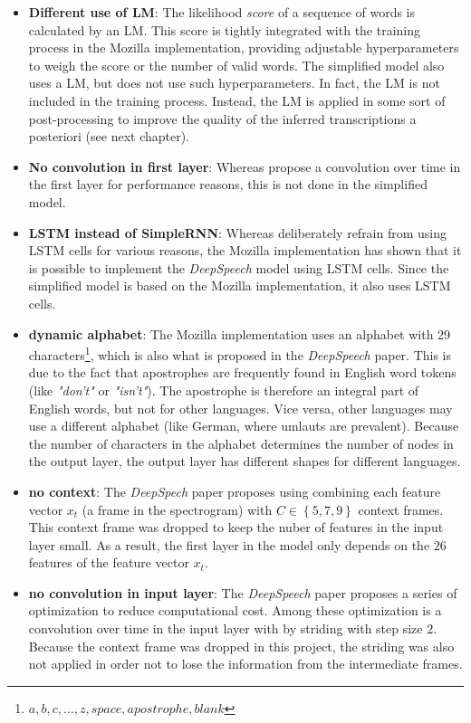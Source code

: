 \begin{itemize}
	\item \textbf{Different use of LM}: The likelihood \textit{score} of a sequence of words is calculated by an \ac{LM}. This score is tightly integrated with the training process in the Mozilla implementation, providing adjustable hyperparameters to weigh the score or the number of valid words. The simplified model also uses a \ac{LM}, but does not use such hyperparameters. In fact, the \ac{LM} is not included in the training process. Instead, the \ac{LM} is applied in some sort of post-processing to improve the quality of the inferred transcriptions a posteriori (see next chapter).
	\item \textbf{No convolution in first layer}: Whereas \cite{ctc_paper} propose a convolution over time in the first layer for performance reasons, this is not done in the simplified model.
	\item \textbf{LSTM instead of SimpleRNN}: Whereas \cite{ctc_paper} deliberately refrain from using \ac{LSTM} cells for various reasons, the Mozilla implementation has shown that it is possible to implement the \textit{DeepSpeech} model using \ac{LSTM} cells. Since the simplified model is based on the Mozilla implementation, it also uses \ac{LSTM} cells.
	\item \textbf{dynamic alphabet}: The Mozilla implementation uses an alphabet with 29 characters\footnote{${a,b,c,...,z, space, apostrophe, blank}$}, which is also what is proposed in the \textit{DeepSpeech} paper. This is due to the fact that apostrophes are frequently found in English word tokens (like \textit{"don't"} or \textit{"isn't"}). The apostrophe is therefore an integral part of English words, but not for other languages. Vice versa, other languages may use a different alphabet (like German, where umlauts are prevalent). Because the number of characters in the alphabet determines the number of nodes in the output layer, the output layer has different shapes for different languages.
	\item \textbf{no context}: The \textit{DeepSpech} paper proposes using combining each feature vector $x_t$ (a frame in the spectrogram) with $C \in \left\{ 5,7,9 \right\}$ context frames. This context frame was dropped to keep the nuber of features in the input layer small. As a result, the first layer in the model only depends on the $26$ features of the feature vector $x_t$.
	\item \textbf{no convolution in input layer}: The \textit{DeepSpeech} paper proposes a series of optimization to reduce computational cost. Among these optimization is a convolution over time in the input layer with by striding with step size $2$. Because the context frame was dropped in this project, the striding was also not applied in order not to lose the information from the intermediate frames.
\end{itemize}


